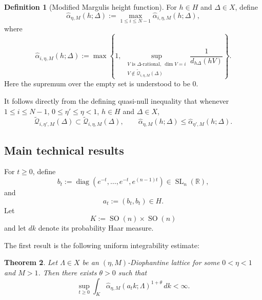 \documentclass[reqno,11pt]{amsart}
\numberwithin{equation}{section}
\newtheorem{theorem}{Theorem}[section]
\theoremstyle{definition}
\newtheorem{definition}[theorem]{Definition}
\theoremstyle{remark}
\newcommand{\op}{\operatorname}
\newcommand{\be}{\begin{equation}}
\newcommand{\ee}{\end{equation}}
\newcommand{\SO}{\op{SO}}
\newcommand{\SL}{\op{SL}}
\begin{document}
\begin{definition}[Modified Margulis height function]
\label{def:modified-Margulis-height}
For $h\in H$ and $\Delta\in X$, define
\begin{equation}\label{eq:modified-alpha}
\widehat\alpha_{\eta,M}(h;\Delta)
:=
\max_{1\le i\le N-1}\widehat\alpha_{i,\eta,M}(h;\Delta),
\end{equation}
where
\begin{equation}\label{eq:hat-local-height}
\widehat\alpha_{i,\eta,M}(h;\Delta)
:=
\max\left\{
1,\ 
\sup_{\substack{
V\text{ is $\Delta$-rational},\ \dim V=i\\
V\notin\widetilde{\mathscr Q}_{i,\eta,M}(\Delta)
}}
\frac{1}{d_{h\Delta}(hV)}
\right\}.
\end{equation}
Here the supremum over the empty set is understood to be $0$.
\end{definition}

It follows directly from the defining quasi-null inequality that
whenever $1\leq i\leq N-1$, $0\le \eta'\le \eta<1$, $h\in H$ and $\Delta\in X$,
\be \label{lem:modified-height-monotonicity}
\widetilde{\mathscr Q}_{i,\eta',M}(\Delta)
\subset
\widetilde{\mathscr Q}_{i,\eta,M}(\Delta),
\qquad
\widehat\alpha_{\eta,M}(h;\Delta)
\le
\widehat\alpha_{\eta',M}(h;\Delta).
\ee



\subsection{Main technical results}

For $t\ge0$, define
\begin{equation}\label{btdef}
b_t:=\operatorname{diag}(e^{-t},\ldots,e^{-t},e^{(n-1)t})
\in\SL_n(\mathbb R),
\end{equation}
and
\begin{equation}\label{atdef}
a_t:=(b_t,b_t)\in H.
\end{equation}
Let $$K:=\SO(n)\times\SO(n)$$ and let $dk$ denote its probability Haar
measure.

The first result is the following  uniform integrability estimate:

\begin{theorem}\label{thm:modifieduniformboundedness}
Let $\Lambda\in X$ be an $(\eta,M)$-Diophantine lattice for some $0<\eta<1$ and $M>1$. Then there exists
$\theta>0$ such that
$$
\sup_{t\ge0}
\int_K
\widehat\alpha_{\eta,M}(a_tk;\Lambda)^{1+\theta}\,dk
<\infty.
$$
\end{theorem}
\end{document}

